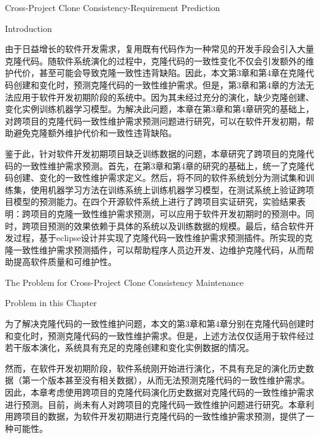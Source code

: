
{Cross-Project Clone Consistency-Requirement Prediction}

{Introduction}

由于日益增长的软件开发需求，复用既有代码作为一种常见的开发手段会引入大量克隆代码。随软件系统演化的过程中，克隆代码的一致性变化不仅会引发额外的维护代价，甚至可能会导致克隆一致性违背缺陷。因此，本文第3章和第4章在克隆代码创建和变化时，预测克隆代码的一致性维护需求。但是，第3章和第4章的方法无法应用于软件开发初期阶段的系统中。因为其未经过充分的演化，缺少克隆创建、变化实例训练机器学习模型。为解决此问题，本章在第3章和第4章研究的基础上，对跨项目的克隆代码一致性维护需求预测问题进行研究，可以在软件开发初期，帮助避免克隆额外维护代价和一致性违背缺陷。

鉴于此，针对软件开发初期项目缺乏训练数据的问题，本章研究了跨项目的克隆代码的一致性维护需求预测。首先，在第3章和第4章的研究的基础上，统一了克隆代码创建、变化的一致性维护需求定义。然后，将不同的软件系统划分为测试集和训练集，使用机器学习方法在训练系统上训练机器学习模型，在测试系统上验证跨项目模型的预测能力。在四个开源软件系统上进行了跨项目实证研究，实验结果表明：跨项目的克隆一致性维护需求预测，可以应用于软件开发初期时的预测中。同时，跨项目预测的效果依赖于具体的系统以及训练数据的规模。最后，结合软件开发过程，基于eclipse设计并实现了克隆代码一致性维护需求预测插件。所实现的克隆一致性维护需求预测插件，可以帮助程序人员边开发、边维护克隆代码，从而帮助提高软件质量和可维护性。

{The Problem for Cross-Project Clone Consistency Maintenance}

{Problem in this Chapter}


为了解决克隆代码的一致性维护问题，本文的第3章和第4章分别在克隆代码创建时和变化时，预测克隆代码的一致性维护需求。但是，上述方法仅仅适用于软件经过若干版本演化，系统具有充足的克隆创建和变化实例数据的情况。

然而，在软件开发初期阶段，软件系统刚开始进行演化，不具有充足的演化历史数据（第一个版本甚至没有相关数据），从而无法预测克隆代码的一致性维护需求。因此，本章考虑使用跨项目的克隆代码演化历史数据对克隆代码的一致性维护需求进行预测。目前，尚未有人对跨项目的克隆代码一致性维护问题进行研究。本章利用跨项目的数据，为软件开发初期进行克隆代码的一致性维护需求预测，提供了一种可能性。


